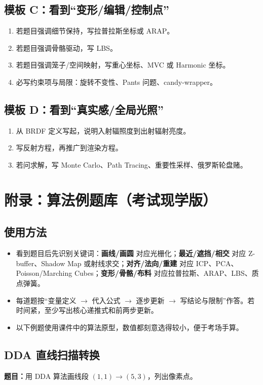 \documentclass[UTF8,zihao=-4,scheme=chinese,fontset=fandol]{ctexart}
\newcommand{\key}[1]{\textbf{#1}}
\begin{document}
\subsection{模板 C：看到“变形/编辑/控制点”}
\begin{enumerate}
  \item 若题目强调细节保持，写拉普拉斯坐标或 ARAP。
  \item 若题目强调骨骼驱动，写 LBS。
  \item 若题目强调笼子/空间映射，写重心坐标、MVC 或 Harmonic 坐标。
  \item 必写约束项与局限：旋转不变性、Pants 问题、candy-wrapper。
\end{enumerate}

\subsection{模板 D：看到“真实感/全局光照”}
\begin{enumerate}
  \item 从 BRDF 定义写起，说明入射辐照度到出射辐射亮度。
  \item 写反射方程，再推广到渲染方程。
  \item 若问求解，写 Monte Carlo、Path Tracing、重要性采样、俄罗斯轮盘赌。
\end{enumerate}

\appendix
\section{附录：算法例题库（考试现学版）}

\subsection{使用方法}
\begin{itemize}
  \item 看到题目后先识别关键词：\key{画线/画圆} 对应光栅化；\key{最近/遮挡/相交} 对应 Z-buffer、Shadow Map 或射线求交；\key{对齐/法向/重建} 对应 ICP、PCA、Poisson/Marching Cubes；\key{变形/骨骼/布料} 对应拉普拉斯、ARAP、LBS、质点弹簧。
  \item 每道题按“变量定义 $\rightarrow$ 代入公式 $\rightarrow$ 逐步更新 $\rightarrow$ 写结论与限制”作答。若时间紧，至少写出核心递推式和前两步更新。
  \item 以下例题使用课件中的算法原型，数值都刻意选得较小，便于考场手算。
\end{itemize}

\subsection{DDA 直线扫描转换}
\textbf{题目：}用 DDA 算法画线段 $(1,1)\to(5,3)$，列出像素点。
\end{document}
